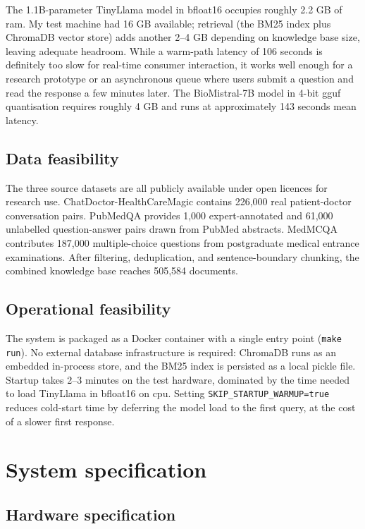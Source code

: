 The 1.1B-parameter TinyLlama model in bfloat16 occupies roughly 2.2 GB of \ac{ram}. My test machine had 16 GB available; retrieval (the BM25 index plus ChromaDB vector store) adds another 2--4 GB depending on knowledge base size, leaving adequate headroom. While a warm-path latency of 106 seconds is definitely too slow for real-time consumer interaction, it works well enough for a research prototype or an asynchronous queue where users submit a question and read the response a few minutes later. The BioMistral-7B model in 4-bit \ac{gguf} quantisation requires roughly 4 GB and runs at approximately 143 seconds mean latency.

\subsection{Data feasibility}

The three source datasets are all publicly available under open licences for research use. ChatDoctor-HealthCareMagic contains 226,000 real patient-doctor conversation pairs. PubMedQA provides 1,000 expert-annotated and 61,000 unlabelled question-answer pairs drawn from PubMed abstracts. MedMCQA contributes 187,000 multiple-choice questions from postgraduate medical entrance examinations. After filtering, deduplication, and sentence-boundary chunking, the combined knowledge base reaches 505,584 documents.

\subsection{Operational feasibility}

The system is packaged as a Docker container with a single entry point (\texttt{make run}). No external database infrastructure is required: ChromaDB runs as an embedded in-process store, and the BM25 index is persisted as a local pickle file. Startup takes 2--3 minutes on the test hardware, dominated by the time needed to load TinyLlama in bfloat16 on \ac{cpu}. Setting \texttt{SKIP\_STARTUP\_WARMUP=true} reduces cold-start time by deferring the model load to the first query, at the cost of a slower first response.

\section{System specification}

\subsection{Hardware specification}

